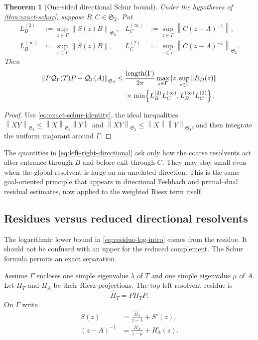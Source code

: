 \documentclass[11pt]{article}
\newtheorem{theorem}{Theorem}[section]
\theoremstyle{definition}
\theoremstyle{remark}
\newcommand{\cQ}{\mathcal Q}
\newcommand{\HS}{\mathfrak S_2}
\newcommand{\norm}[1]{\left\lVert #1\right\rVert}
\begin{document}
\begin{theorem}[One-sided directional Schur bound]
\label{thm:directional-bound}
Under the hypotheses of \cref{thm:exact-schur}, suppose $B,C\in\HS$.  Put
\begin{align}
 L_B^{(2)}
 &:=\sup_{z\in\Gamma}\norm{S(z)B}_{\HS},
 &
 L_C^{(\infty)}
 &:=\sup_{z\in\Gamma}\norm{C(z-A)^{-1}},
 \label{eq:left-right-directional}\\
 L_B^{(\infty)}
 &:=\sup_{z\in\Gamma}\norm{S(z)B},
 &
 L_C^{(2)}
 &:=\sup_{z\in\Gamma}\norm{C(z-A)^{-1}}_{\HS}.
 \label{eq:left-right-directional-symmetric}
\end{align}
Then
\begin{align}
 \norm{P\cQ_\Gamma(T)P-\cQ_\Gamma(A)}_{\HS}
 \le{}&
 \frac{\operatorname{length}(\Gamma)}{2\pi}
 \max_{z\in\Gamma}|z|
 \sup_{z\in\Gamma}\norm{R_D(z)}
 \notag\\
 &\times
 \min\!\left\{
 L_B^{(2)}L_C^{(\infty)},
 L_B^{(\infty)}L_C^{(2)}
 \right\}.
 \label{eq:directional-schur-bound}
\end{align}
\end{theorem}

\begin{proof}
Use \eqref{eq:exact-schur-identity}, the ideal inequalities
$\norm{XY}_{\HS}\le\norm{X}_{\HS}\norm{Y}$ and
$\norm{XY}_{\HS}\le\norm{X}\norm{Y}_{\HS}$, and then integrate the uniform
majorant around $\Gamma$.
\end{proof}

The quantities in \eqref{eq:left-right-directional} ask only how the
coarse resolvents act after entrance through $B$ and before exit through
$C$.  They may stay small even when the global resolvent is large on an
unrelated direction.  This is the same goal-oriented principle that appears
in directional Feshbach and primal--dual residual estimates, now applied to
the weighted Riesz term itself.

\subsection{Residues versus reduced directional resolvents}

The logarithmic lower bound in \eqref{eq:residue-log-intro} comes from the
residue.  It should not be confused with an upper for the reduced
complement.  The Schur formula permits an exact separation.

Assume $\Gamma$ encloses one simple eigenvalue $\lambda$ of $T$ and one
simple eigenvalue $\mu$ of $A$.  Let $\Pi_T$ and $\Pi_A$ be their Riesz
projections.  The top-left resolvent residue is
\begin{equation}
 \widehat\Pi_T=P\Pi_TP.
 \label{eq:compressed-residue}
\end{equation}
On $\Gamma$ write
\begin{align}
 S(z)&=\frac{\widehat\Pi_T}{z-\lambda}+S^\circ(z),
 \label{eq:S-reduced}\\
 (z-A)^{-1}&=\frac{\Pi_A}{z-\mu}+R_A^\circ(z).
 \label{eq:RA-reduced}
\end{align}
\end{document}
